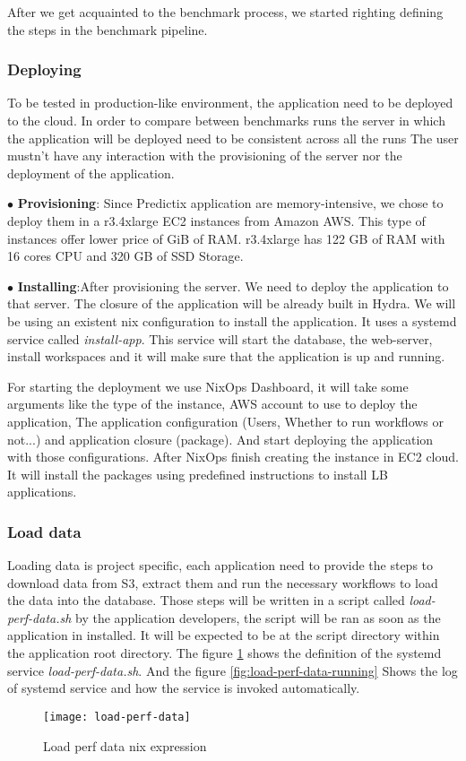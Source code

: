 After we get acquainted to the benchmark process, we started righting defining
the steps in the benchmark pipeline.
\subsubsection{Deploying}
To be tested in production-like environment, the
application need to be deployed to the cloud. In order to compare between
benchmarks runs the server in which the application will be deployed need to be
consistent across all the runs The user mustn't have any interaction with the
provisioning of the server nor the deployment of the application. 

$\bullet$ \textbf{Provisioning}: Since Predictix application are
memory-intensive, we chose to deploy them in a r3.4xlarge EC2 instances from
Amazon AWS. This type of instances offer lower price of GiB of RAM. r3.4xlarge
has 122 GB of RAM with 16 cores CPU and 320 GB of SSD Storage.

$\bullet$ \textbf{Installing}:After provisioning the server. We need to deploy
the application to that server. The closure of the application will be already
built in Hydra. We will be using an existent nix configuration to install the
application. It uses a systemd service called \emph{install-app}. This service
will start the database, the web-server, install workspaces and it will make
sure that the application is up and running.

For starting the deployment we use NixOps Dashboard, it will take
some arguments like the type of the instance, AWS account to use to deploy
the application, The application configuration (Users, Whether to run workflows
or not...) and application closure (package). And start deploying the
application with those configurations. After NixOps finish creating the instance
in EC2 cloud. It will install the packages using predefined instructions to
install LB applications.

\subsubsection{Load data}
Loading data is project specific, each application need to provide the steps to
download data from S3, extract them and run the necessary workflows to load the
data into the database. Those steps will be written in a script called
\emph{load-perf-data.sh} by the application developers, the script will be ran as
soon as the application in installed. It will be expected to be at the script
directory within the application root directory. The figure
\hyperref[fig:load-perf-data]{\ref{fig:load-perf-data}} shows the definition of
the systemd service \emph{load-perf-data.sh}. And the figure
\hyperref[fig:load-perf-data-running]{\ref{fig:load-perf-data-running}} Shows
the log of systemd service and how the service is invoked automatically.
\begin{figure}[h]
  \texttt{[image: load-perf-data]}
\caption{Load perf data nix expression}
\label{fig:load-perf-data}
\end{figure}


